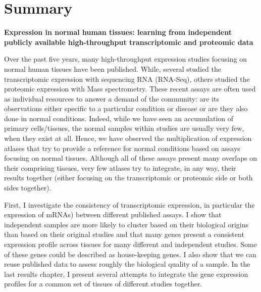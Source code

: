 \clearpage
\chapter*{Summary}
\label{ch:summary}

\begin{singlespace}

%

    \textbf{Expression in normal human tissues: learning from
    independent publicly available high-throughput transcriptomic and proteomic
    data}

    \begin{small}
    Over the past five years, many high-throughput expression studies focusing
    on normal human tissues have been published. While, several studied the
    transcriptomic expression with sequencing \gls{RNA} (\gls{RNA-Seq}), others
    studied the proteomic expression with Mass spectrometry. These recent assays
    are often used as individual resources to answer a demand of the community:
    are its observations either specific to a particular condition or disease or
    are they also done in normal conditions. Indeed, while we have seen
    an accumulation of primary cells/tissues, the normal samples within studies
    are usually very few, when they exist at all. Hence, we have observed the
    multiplication of expression atlases that try to provide
    a reference for normal conditions based on assays focusing on normal tissues.
    Although all of these assays present many overlaps on their comprising tissues,
    very few atlases try to integrate, in any way, their results together
    (either focusing on the transcriptomic or proteomic side or both sides
    together).

    First, I investigate the consistency of transcriptomic expression,
    in particular the expression of mRNAs) between different
    published assays. I show that independent samples are more likely to
    cluster based on their biological origins than based on their original
    studies and that many genes present a consistent expression profile across
    tissues for many different and independent studies. Some of these genes could
    be described as house-keeping genes. I also show that we can reuse published
    data to assess roughly the biological quality of a sample. In the last
    results chapter, I present several attempts to integrate the gene expression
    profiles for a common set of tissues of different studies together.


\end{small}
\end{singlespace}
